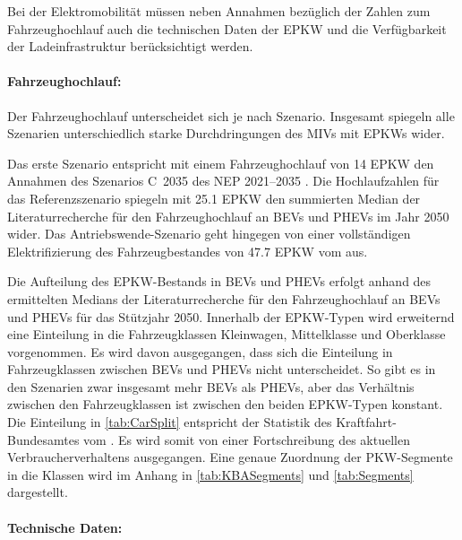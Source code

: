 Bei der Elektromobilität müssen neben Annahmen bezüglich der Zahlen zum Fahrzeughochlauf auch die technischen Daten der \gls{EPKW} und die Verfügbarkeit der Ladeinfrastruktur berücksichtigt werden.


\paragraph{Fahrzeughochlauf:}
Der Fahrzeughochlauf unterscheidet sich je nach Szenario.
Insgesamt spiegeln alle Szenarien unterschiedlich starke Durchdringungen des \glspl{MIV} mit \glspl{EPKW} wider.\medskip

Das erste Szenario entspricht mit einem Fahrzeughochlauf von \SI{14}{\Mio} \gls{EPKW} den Annahmen des Szenarios C~\num{2035} des \gls{NEP} \numrange[range-phrase=~{--}~]{2021}{2035} \cite{BNetzA2020}.
Die Hochlaufzahlen für das Referenzszenario spiegeln mit \SI{25.1}{\Mio} \gls{EPKW} den summierten Median der Literaturrecherche für den Fahrzeughochlauf an \glspl{BEV} und \glspl{PHEV} im Jahr \num{2050} wider.
Das Antriebswende-Szenario geht hingegen von einer vollständigen Elektrifizierung des Fahrzeugbestandes von \SI{47.7}{\Mio} \gls{EPKW} vom  \cite{KBA2020} aus.



Die Aufteilung des \gls{EPKW}-Bestands in \glspl{BEV} und \glspl{PHEV} erfolgt anhand des ermittelten Medians der Literaturrecherche für den Fahrzeughochlauf an \glspl{BEV} und \glspl{PHEV} für das Stützjahr \num{2050}.
Innerhalb der \gls{EPKW}-Typen wird erweiternd eine Einteilung in die Fahrzeugklassen Kleinwagen, Mittelklasse und Oberklasse vorgenommen.
Es wird davon ausgegangen, dass sich die Einteilung in Fahrzeugklassen zwischen \glspl{BEV} und \glspl{PHEV} nicht unterscheidet.
So gibt es in den Szenarien zwar insgesamt mehr \glspl{BEV} als \glspl{PHEV}, aber das Verhältnis zwischen den Fahrzeugklassen ist zwischen den beiden \gls{EPKW}-Typen konstant.
Die Einteilung in \autoref{tab:CarSplit} entspricht der Statistik des Kraftfahrt-Bundesamtes \cite{KBASegments2020} vom .
Es wird somit von einer Fortschreibung des aktuellen Verbraucherverhaltens ausgegangen.
Eine genaue Zuordnung der \gls{PKW}-Segmente in die Klassen wird im Anhang in \autoref{tab:KBASegments} und \autoref{tab:Segments} dargestellt.




\paragraph{Technische Daten:}

